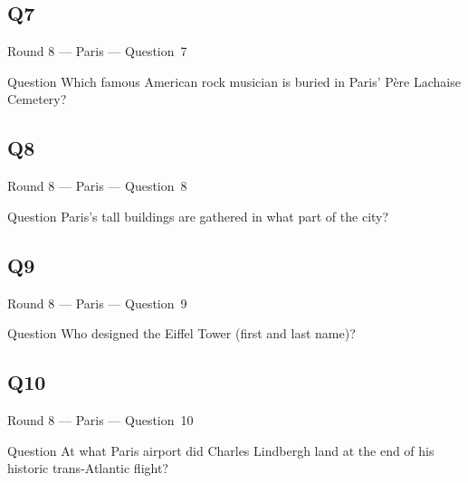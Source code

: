 \documentclass[11pt]{beamer}
\begin{document}
\subsection*{Q7}
\begin{frame}[t]{Round 8 --- Paris --- \mbox{Question 7}}
\vspace{-0.5em}
\begin{block}{Question}
Which famous American rock musician is buried in Paris' P{\`e}re Lachaise Cemetery?
\end{block}
\end{frame}
\subsection*{Q8}
\begin{frame}[t]{Round 8 --- Paris --- \mbox{Question 8}}
\vspace{-0.5em}
\begin{block}{Question}
Paris's tall buildings are gathered in what part of the city?
\end{block}
\end{frame}
\subsection*{Q9}
\begin{frame}[t]{Round 8 --- Paris --- \mbox{Question 9}}
\vspace{-0.5em}
\begin{block}{Question}
Who designed the Eiffel Tower (first and last name)?
\end{block}
\end{frame}
\subsection*{Q10}
\begin{frame}[t]{Round 8 --- Paris --- \mbox{Question 10}}
\vspace{-0.5em}
\begin{block}{Question}
At what Paris airport did Charles Lindbergh land at the end of his historic trans-Atlantic flight?
\end{block}
\end{frame}
\end{document}
